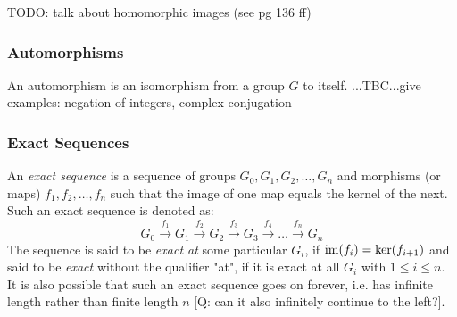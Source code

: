 
TODO: talk about homomorphic images (see \cite{ABoAA} pg 136 ff)

\subsubsection{Automorphisms}
An automorphism is an isomorphism from a group $G$ to itself. ...TBC...give examples: negation of integers, complex conjugation






\subsubsection{Exact Sequences}
An \emph{exact sequence} is a sequence of groups $G_0, G_1, G_2, \ldots, G_n$ and morphisms (or maps) $f_1, f_2, \ldots, f_n$ such that the image of one map equals the kernel of the next. Such an exact sequence is denoted as:
\begin{equation}
 G_0 \xrightarrow{f_1} G_1 
     \xrightarrow{f_2} G_2 
     \xrightarrow{f_3} G_3
     \xrightarrow{f_4} 
     \ldots
     \xrightarrow{f_n} G_n  
\end{equation}
The sequence is said to be \emph{exact at} some particular $G_i$, if $\operatorname{im}(f_i) = \ker(f_{i+1})$ and said to be \emph{exact} without the qualifier "at", if it is exact at all $G_i$ with $1 \leq i \leq n$. It is also possible that such an exact sequence goes on forever, i.e. has infinite length rather than finite length $n$ [Q: can it also infinitely continue to the left?]. 

